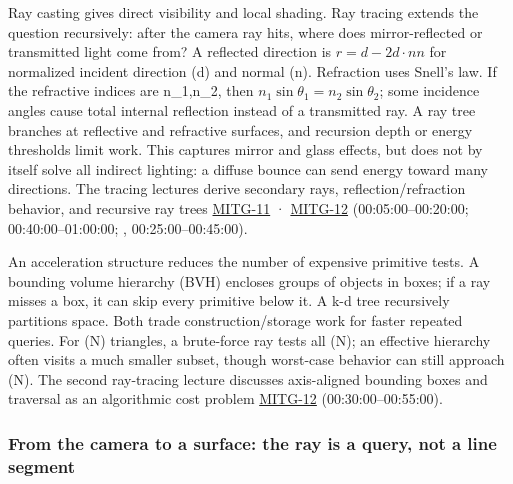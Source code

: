 Ray casting gives direct visibility and local shading. Ray tracing extends the question recursively: after the camera ray hits, where does mirror-reflected or transmitted light come from? A reflected direction is \(r=d-2d\cdot nn\) for normalized incident direction (d) and normal (n). Refraction uses Snell's law. If the refractive indices are n\_1,n\_2, then \(n_1\sin\theta_1=n_2\sin\theta_2\); some incidence angles cause total internal reflection instead of a transmitted ray. A ray tree branches at reflective and refractive surfaces, and recursion depth or energy thresholds limit work. This captures mirror and glass effects, but does not by itself solve all indirect lighting: a diffuse bounce can send energy toward many directions. The tracing lectures derive secondary rays, reflection/refraction behavior, and recursive ray trees \hyperref[04-visual-computing-ii-ch036]{MITG-11} · \hyperref[04-visual-computing-ii-ch036]{MITG-12} (00:05:00--00:20:00; 00:40:00--01:00:00; , 00:25:00--00:45:00).

An acceleration structure reduces the number of expensive primitive tests. A bounding volume hierarchy (BVH) encloses groups of objects in boxes; if a ray misses a box, it can skip every primitive below it. A k-d tree recursively partitions space. Both trade construction/storage work for faster repeated queries. For (N) triangles, a brute-force ray tests all (N); an effective hierarchy often visits a much smaller subset, though worst-case behavior can still approach (N). The second ray-tracing lecture discusses axis-aligned bounding boxes and traversal as an algorithmic cost problem \hyperref[04-visual-computing-ii-ch036]{MITG-12} (00:30:00--00:55:00).

\subsubsection{From the camera to a surface: the ray is a query, not a line segment}\label{from-the-camera-to-a-surface-the-ray-is-a-query-not-a-line-segment}


